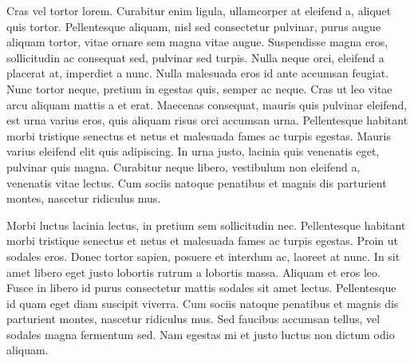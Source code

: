 Cras vel tortor lorem. Curabitur enim ligula, ullamcorper at eleifend
a, aliquet quis tortor. Pellentesque aliquam, nisl sed consectetur
pulvinar, purus augue aliquam tortor, vitae ornare sem magna vitae
augue. Suspendisse magna eros, sollicitudin ac consequat sed, pulvinar
sed turpis. Nulla neque orci, eleifend a placerat at, imperdiet a
nunc. Nulla malesuada eros id ante accumsan feugiat. Nunc tortor
neque, pretium in egestas quis, semper ac neque. Cras ut leo vitae
arcu aliquam mattis a et erat. Maecenas consequat, mauris quis
pulvinar eleifend, est urna varius eros, quis aliquam risus orci
accumsan urna. Pellentesque habitant morbi tristique senectus et netus
et malesuada fames ac turpis egestas. Mauris varius eleifend elit quis
adipiscing. In urna justo, lacinia quis venenatis eget, pulvinar quis
magna. Curabitur neque libero, vestibulum non eleifend a, venenatis
vitae lectus. Cum sociis natoque penatibus et magnis dis parturient
montes, nascetur ridiculus mus.
\endrule

\narrower

\startrule
Morbi luctus lacinia lectus, in pretium sem sollicitudin
nec. Pellentesque habitant morbi tristique senectus et netus et
malesuada fames ac turpis egestas. Proin ut sodales eros. Donec tortor
sapien, posuere et interdum ac, laoreet at nunc. In sit amet libero
eget justo lobortis rutrum a lobortis massa. Aliquam et eros
leo. Fusce in libero id purus consectetur mattis sodales sit amet
lectus. Pellentesque id quam eget diam suscipit viverra. Cum sociis
natoque penatibus et magnis dis parturient montes, nascetur ridiculus
mus. Sed faucibus accumsan tellus, vel sodales magna fermentum
sed. Nam egestas mi et justo luctus non dictum odio aliquam.
\endrule


\bye
